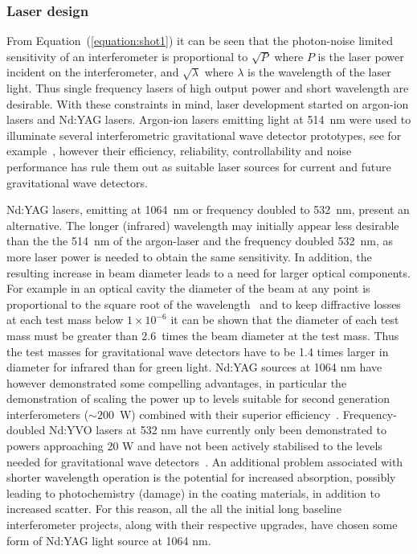 \documentclass{article}
\begin{document}

\subsubsection{Laser design}
\label{subsubsection:laserdesign}

From Equation~(\ref{equation:shot1}) it can be seen that the photon-noise
limited sensitivity of an interferometer is proportional to $\sqrt{P}$ where $P$
is the laser power incident on the interferometer, and $\sqrt{\lambda}$ where
$\lambda$ is the wavelength of the laser light. Thus single frequency lasers of
high output power and short wavelength are desirable. With these constraints in
mind, laser development started on argon-ion lasers and Nd:YAG lasers.
Argon-ion lasers emitting light at 514~nm were used to illuminate several
interferometric gravitational wave detector prototypes, see for
example~\cite{Shoemaker, Robertson}, however their efficiency, reliability,
controllability and noise performance has rule them out as suitable laser
sources for current and future gravitational wave detectors.

Nd:YAG lasers, emitting at 1064~nm or frequency doubled to 532~nm, present an
alternative. The longer (infrared) wavelength may initially appear less
desirable than the the 514~nm of the argon-laser and the frequency doubled
532~nm, as more laser power is needed to obtain the same sensitivity.  In
addition, the resulting increase in beam diameter leads to a need for larger
optical components. For example in an optical cavity the diameter of the beam at
any point is proportional to the square root of the wavelength~\cite{Kogelnik}
and to keep diffractive losses at each test mass below $1 \times 10^{-6}$ it can
be shown that the diameter of each test mass must be greater than 2.6~times the
beam diameter at the test mass. Thus the test masses for gravitational wave
detectors have to be 1.4 times larger in diameter for infrared than for green
light. Nd:YAG sources at 1064 nm have however demonstrated some compelling
advantages, in particular the demonstration of scaling the power up to levels
suitable for second generation interferometers ($\sim200$~W) combined with their
superior efficiency~\cite{Shine,Vogt,Kerr}. Frequency-doubled Nd:YVO lasers at
532 nm have currently only been demonstrated to powers approaching 20 W and have
not been actively stabilised to the levels needed for gravitational wave
detectors~\cite{Mavalvala:2010}. An additional problem associated with shorter
wavelength operation is the potential for increased absorption, possibly leading
to photochemistry (damage) in the coating materials, in addition to increased
scatter. For this reason, all the all the initial long baseline interferometer
projects, along with their respective upgrades, have chosen some form of Nd:YAG
light source at 1064 nm.
\end{document}
